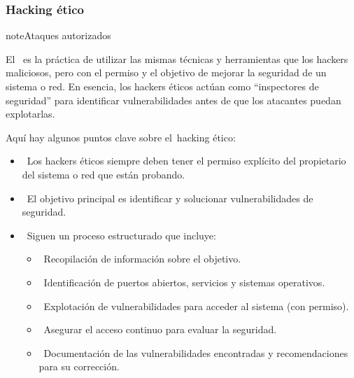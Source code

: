 \documentclass[letterpaper,10pt,spanish]{sphinxmanual}
\begin{document}
\subsubsection{Hacking ético}
\label{\detokenize{1_guias/10informatica/G1003:hacking-etico}}
\begin{sphinxadmonition}{note}{Ataques autorizados}

\sphinxAtStartPar
El  es la práctica de utilizar las mismas técnicas y herramientas que los hackers maliciosos, pero con el permiso y el objetivo de mejorar la seguridad de un sistema o red. En esencia, los hackers éticos actúan como “inspectores de seguridad” para identificar vulnerabilidades antes de que los atacantes puedan explotarlas.

\sphinxAtStartPar
Aquí hay algunos puntos clave sobre el hacking ético:
\begin{itemize}
\item {} 
\sphinxAtStartPar
{} Los hackers éticos siempre deben tener el permiso explícito del propietario del sistema o red que están probando.

\item {} 
\sphinxAtStartPar
{} El objetivo principal es identificar y solucionar vulnerabilidades de seguridad.

\item {} 
\sphinxAtStartPar
{} Siguen un proceso estructurado que incluye:
\begin{itemize}
\item {} 
\sphinxAtStartPar
{} Recopilación de información sobre el objetivo.

\item {} 
\sphinxAtStartPar
{} Identificación de puertos abiertos, servicios y sistemas operativos.

\item {} 
\sphinxAtStartPar
{} Explotación de vulnerabilidades para acceder al sistema (con permiso).

\item {} 
\sphinxAtStartPar
{} Asegurar el acceso continuo para evaluar la seguridad.

\item {} 
\sphinxAtStartPar
{} Documentación de las vulnerabilidades encontradas y recomendaciones para su corrección.


\end{itemize}
\end{itemize}
\end{sphinxadmonition}
\end{document}
